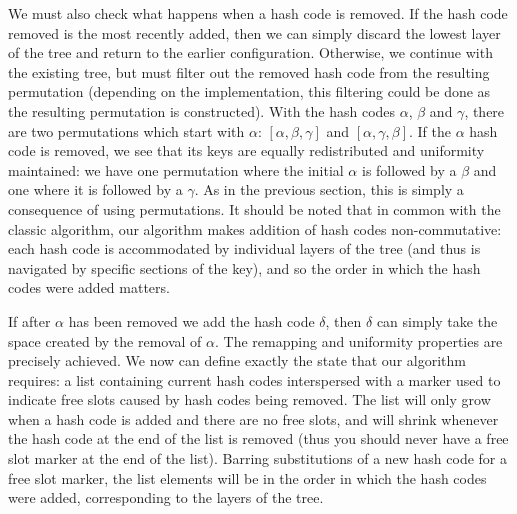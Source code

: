 \documentclass[runningheads,a4paper]{llncs}
\begin{document}
We must also check what happens when a hash code is removed. If the
hash code removed is the most recently added, then we can simply
discard the lowest layer of the tree and return to the earlier
configuration. Otherwise, we continue with the existing tree, but must
filter out the removed hash code from the resulting permutation
(depending on the implementation, this filtering could be done as the
resulting permutation is constructed). With the hash codes $\alpha$,
$\beta$ and $\gamma$, there are two permutations which start with
$\alpha$: $[\alpha,\beta,\gamma]$ and $[\alpha,\gamma,\beta]$. If the
$\alpha$ hash code is removed, we see that its keys are equally
redistributed and uniformity maintained: we have one permutation where
the initial $\alpha$ is followed by a $\beta$ and one where it is
followed by a $\gamma$. As in the previous section, this is simply a
consequence of using permutations. It should be noted that in common
with the classic algorithm, our algorithm makes addition of hash codes
non-commutative: each hash code is accommodated by individual layers
of the tree (and thus is navigated by specific sections of the key),
and so the order in which the hash codes were added matters.

If after $\alpha$ has been removed we add the hash code $\delta$, then
$\delta$ can simply take the space created by the removal of
$\alpha$. The remapping and uniformity properties are precisely
achieved. We now can define exactly the state that our algorithm
requires: a list containing current hash codes interspersed with a
marker used to indicate free slots caused by hash codes being
removed. The list will only grow when a hash code is added and there
are no free slots, and will shrink whenever the hash code at the end
of the list is removed (thus you should never have a free slot marker
at the end of the list). Barring substitutions of a new hash code for
a free slot marker, the list elements will be in the order in which
the hash codes were added, corresponding to the layers of the tree.
\end{document}
